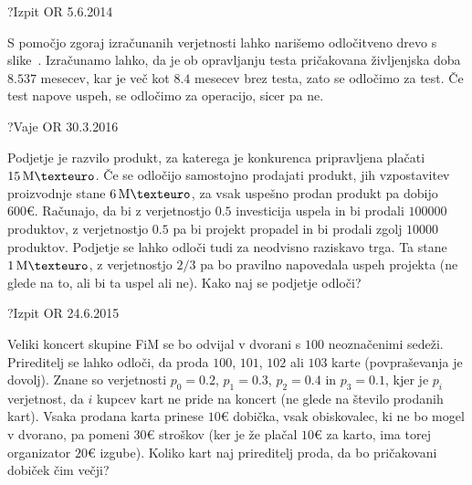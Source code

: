 \begin{naloga}{?}{Izpit OR 5.6.2014}
\begin{odgovor}
\begin{enumerate}[(a)]
S pomočjo zgoraj izračunanih verjetnosti
lahko narišemo odločitveno drevo s slike~\fig{}.
Izračunamo lahko, da je ob opravljanju testa
pričakovana življenjska doba $8.537$ mesecev,
kar je več kot $8.4$ mesecev brez testa,
zato se odločimo za test.
Če test napove uspeh, se odločimo za operacijo, sicer pa ne.
\end{enumerate}

\begin{slika}
\makebox[\textwidth][c]{
\pgfslika
}
\end{slika}
\end{odgovor}
\end{naloga}


\begin{naloga}{?}{Vaje OR 30.3.2016}
\begin{vprasanje}
Podjetje je razvilo produkt,
za katerega je konkurenca pripravljena plačati $15 \ME$.
Če se odločijo samostojno prodajati produkt,
jih vzpostavitev proizvodnje stane $6 \ME$,
za vsak uspešno prodan produkt pa dobijo $600 €$.
Računajo, da bi z ve\-rjet\-nost\-jo $0.5$ investicija uspela
in bi prodali $100000$ produktov,
z verjetnostjo $0.5$ pa bi projekt propadel
in bi prodali zgolj $10000$ produktov.
Podjetje se lahko odloči tudi za neodvisno raziskavo trga.
Ta stane $1 \ME$,
z verjetnostjo $2/3$ pa bo pravilno napovedala uspeh projekta
(ne glede na to, ali bi ta uspel ali ne).
Kako naj se podjetje odloči?

\end{vprasanje}
\begin{odgovor}
\end{odgovor}
\end{naloga}


\begin{naloga}{?}{Izpit OR 24.6.2015}
\begin{vprasanje}
Veliki koncert skupine FiM
se bo odvijal v dvorani s $100$ neoznačenimi sedeži.
Prireditelj se lahko odloči, da proda $100$, $101$, $102$ ali $103$ karte
(povpraševanja je dovolj).
Znane so verjetnosti $p_0 = 0.2$, $p_1 = 0.3$, $p_2 = 0.4$ in $p_3 = 0.1$,
kjer je $p_i$ verjetnost, da $i$ kupcev kart ne pride na koncert
(ne glede na število prodanih kart).
Vsaka prodana karta prinese $10 €$ dobička,
vsak obiskovalec, ki ne bo mogel v dvorano, pa pomeni $30 €$ stroškov
(ker je že plačal $10 €$ za karto, ima torej organizator $20 €$ izgube).
Koliko kart naj prireditelj proda, da bo pričakovani dobiček čim večji?

\end{vprasanje}
\begin{odgovor}
\end{odgovor}
\end{naloga}


